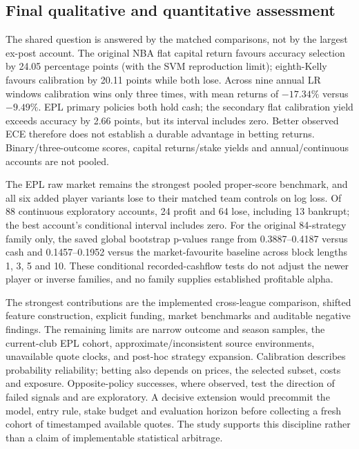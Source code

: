 \documentclass[11pt,letterpaper]{article}
\begin{document}
\subsection{Final qualitative and quantitative assessment}
The shared question is answered by the matched comparisons, not by the
largest ex-post account. The original NBA flat capital return favours
accuracy selection by 24.05 percentage points (with the SVM reproduction
limit); eighth-Kelly favours calibration by 20.11 points while both lose.
Across nine annual LR windows calibration wins only three times, with mean
returns of $-17.34\%$ versus $-9.49\%$. EPL primary policies both hold cash;
the secondary flat calibration yield exceeds accuracy by 2.66 points, but
its interval includes zero. Better observed ECE therefore does not establish
a durable advantage in betting returns. Binary/three-outcome scores,
capital returns/stake yields and annual/continuous accounts are not pooled.

The EPL raw market remains the strongest pooled proper-score benchmark,
and all six added player variants lose to their matched team controls on
log loss. Of 88 continuous exploratory accounts, 24 profit and 64 lose,
including 13 bankrupt; the best account's conditional interval includes
zero. For the original 84-strategy family only, the saved global bootstrap
p-values range from 0.3887--0.4187 versus cash and 0.1457--0.1952 versus
the market-favourite baseline across block lengths 1, 3, 5 and 10. These
conditional recorded-cashflow tests do not adjust the newer player or
inverse families, and no family supplies established profitable alpha.

The strongest contributions are the implemented cross-league comparison,
shifted feature construction, explicit funding, market benchmarks and
auditable negative findings. The remaining limits are narrow outcome and
season samples, the current-club EPL cohort, approximate/inconsistent
source environments, unavailable quote clocks, and post-hoc strategy
expansion. Calibration describes probability reliability; betting also
depends on prices, the selected subset, costs and exposure. Opposite-policy
successes, where observed, test the direction of failed signals and are
exploratory. A decisive extension would precommit the model, entry rule,
stake budget and evaluation horizon before collecting a fresh cohort of
timestamped available quotes. The study supports this discipline rather
than a claim of implementable statistical arbitrage.
\end{document}
